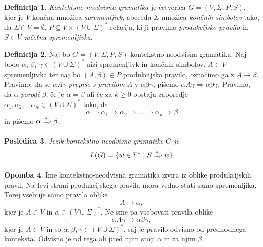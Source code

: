 \documentclass{amsart}
\theoremstyle{definition} %
\newtheorem{definicija}{Definicija}[section]
\newtheorem{opomba}[definicija]{Opomba}
\theoremstyle{plain} %
\newtheorem{posledica}[definicija]{Posledica}
\begin{document}
\begin{definicija}

    \textit{Kontektsno-neodvisna gramatika} je četverica $ G = ( V, \Sigma, P, S ) $, kjer je
    $ V $ končna množica \textit{spremenljivk}, abeceda $ \Sigma $ množica \textit{končnih simbolov} tako,
    da $ \Sigma \cap V = \emptyset $, $ P \subseteq V \times ( V \cup \Sigma )^* $ relacija, ki ji
    pravimo \textit{produkcijsko pravilo} in $ S \in V $ \textit{začetna spremenljivka}.

\end{definicija}

\begin{definicija}
    
    Naj bo $ G = ( V, \Sigma, P, S ) $ kontekstno-neodvisna gramatika. Naj bodo $ \alpha $,
    $ \beta $, $ \gamma \in ( V \cup \Sigma )^* $ nizi spremenljivk in končnih simbolov,
    $ A \in V $ spremenljivka ter naj bo $ ( A, \beta ) \in P $ produkcijsko pravilo,
    označimo ga z $ A \rightarrow \beta $. Pravimo, da se $ \alpha A \gamma $ 
    \textit{prepiše s pravilom} $ A $ v $ \alpha\beta\gamma $, pišemo $ \alpha A \gamma  \Rightarrow 
    \alpha\beta\gamma $. Pravimo, da $ \alpha $ \textit{porodi} $ \beta $, če je $ \alpha = \beta $ ali če
    za $ k \geq 0 $ obstaja zaporedje $ \alpha_1, \alpha_2, \ldots \alpha_n
    \in ( V \cup \Sigma )^* $ tako, da 
    \[
        \alpha \Rightarrow \alpha_1 \Rightarrow \alpha_2 \Rightarrow \ldots \Rightarrow \alpha_n
        \Rightarrow \beta
    \]
    in pišemo $ \alpha \xRightarrow{*} \beta $.

\end{definicija}

\begin{posledica}

    Jezik kontekstno neodvisne gramatike $ G $ je
    \[
        L(G) = \{ w \in \Sigma^* \mid S \xRightarrow{*} w \}
    \]

\end{posledica}

\begin{opomba}
    
    Ime kontekstno-neodvisna gramatika izvira iz oblike produkcijskih pravil. Na levi
    strani produkcijskega pravila mora vedno stati samo spremenljika. Torej vsebuje samo
    pravila oblike
    \[
        A \rightarrow \alpha,
    \]
    kjer je  $ A \in V $ in $ \alpha \in ( V \cup \Sigma )^* $. Ne sme pa vsebovati
    pravila oblike
    \[
        \alpha A \gamma \rightarrow \alpha\beta\gamma,
    \]
    kjer je $ A \in V $ in so $ \alpha, \beta, \gamma \in ( V \cup \Sigma )^* $, saj je
    pravilo odvisno od predhodnega konteksta. Odvisno je od tega ali pred njim stoji $ \alpha $
    in za njim $ \beta $.

\end{opomba}
\end{document}
